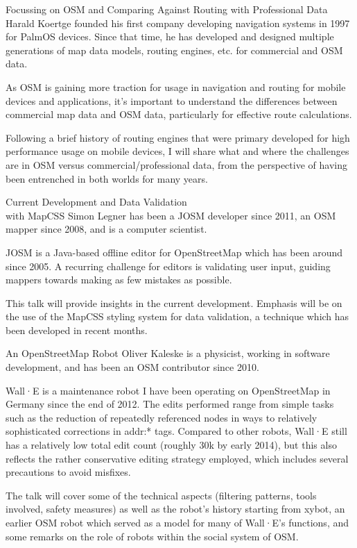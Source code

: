 %
{Focussing on OSM and Comparing Against Routing with Professional Data}%
{Harald Koertge founded his first company developing navigation systems in 1997 for PalmOS devices. Since that time, he has developed and designed multiple generations of map data models, routing engines, etc. for commercial and OSM data.}%
{As OSM is gaining more traction for usage in navigation and routing for mobile devices and applications, it’s important to understand the differences between commercial map data and OSM data, particularly for effective route calculations. 

Following a brief history of routing engines that were primary developed for high performance usage on mobile devices, I will share what and where the challenges are in OSM versus commercial/professional data, from the perspective of having been entrenched in both worlds for many years.}

%
{Current Development and Data Validation\\ with MapCSS}%
{Simon Legner has been a JOSM developer since 2011, an OSM mapper since 2008, and is a computer scientist.}%
{JOSM is a Java-based offline editor for OpenStreetMap which has been around since 2005. A recurring challenge for editors is validating user input, guiding mappers towards making as few mistakes as possible.

This talk will provide insights in the current development. Emphasis will be on the use of the MapCSS styling system for data validation, a technique which has been developed in recent months.}

%
{An OpenStreetMap Robot}%
{Oliver Kaleske is a physicist, working in software development, and has been an OSM contributor since 2010.}%
{Wall·E is a maintenance robot I have been operating on OpenStreetMap in Germany since the end of 2012. The edits performed range from simple tasks such as the reduction of repeatedly referenced nodes in
ways to relatively sophisticated corrections in addr:* tags. Compared to other robots, Wall·E still has a relatively low total edit count (roughly 30k by early 2014), but this also
reflects the rather conservative editing strategy employed, which includes several precautions to avoid misfixes.

The talk will cover some of the technical aspects (filtering patterns, tools involved, safety measures) as well as the robot's history starting from xybot, an earlier OSM robot which served as
a model for many of Wall·E's functions, and some remarks on the role of robots within the social system of OSM.}

